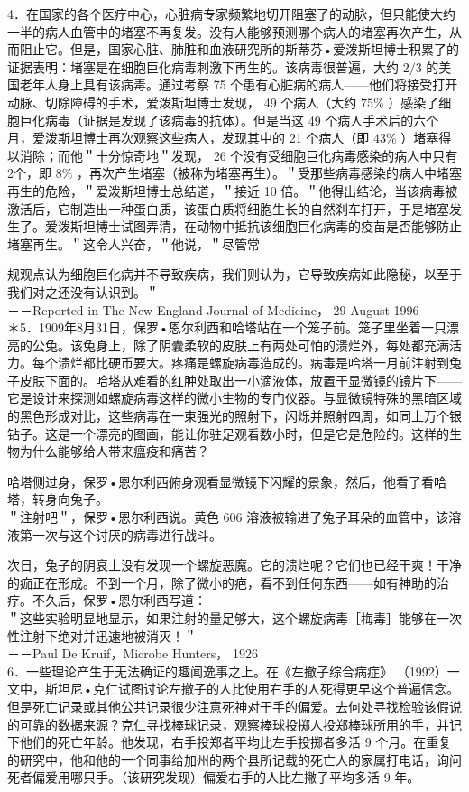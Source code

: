 4．在国家的各个医疗中心，心脏病专家频繁地切开阻塞了的动脉，但只能使大约一半的病人血管中的堵塞不再复发。没有人能够预测哪个病人的堵塞再次产生，从而阻止它。但是，国家心脏、肺脏和血液研究所的斯蒂芬•爱泼斯坦博士积累了的证据表明：堵塞是在细胞巨化病毒刺激下再生的。该病毒很普遍，大约 $2 / 3$ 的美国老年人身上具有该病毒。通过考察 75 个患有心脏病的病人——他们将接受打开动脉、切除障碍的手术，爱泼斯坦博士发现， 49 个病人（大约 $75 \%$ ）感染了细胞巨化病毒（证据是发现了该病毒的抗体）。但是当这 49 个病人手术后的六个月，爱泼斯坦博士再次观察这些病人，发现其中的 21 个病人（即 $43 \%$ ）堵塞得以消除；而他＂十分惊奇地＂发现， 26 个没有受细胞巨化病毒感染的病人中只有 2个，即 $8 \%$ ，再次产生堵塞（被称为堵塞再生）。＂受那些病毒感染的病人中堵塞再生的危险，＂爱泼斯坦博士总结道，＂接近 10 倍。＂他得出结论，当该病毒被激活后，它制造出一种蛋白质，该蛋白质将细胞生长的自然刹车打开，于是堵塞发生了。爱泼斯坦博士试图弄清，在动物中抵抗该细胞巨化病毒的疫苗是否能够防止堵塞再生。＂这令人兴奋，＂他说，＂尽管常

规观点认为细胞巨化病并不导致疾病，我们则认为，它导致疾病如此隐秘，以至于我们对之还没有认识到。＂\\
－－Reported in The New England Journal of Medicine， 29 August 1996\\
＊5．1909年8月31日，保罗•恩尔利西和哈塔站在一个笼子前。笼子里坐着一只漂亮的公兔。该兔身上，除了阴囊柔软的皮肤上有两处可怕的溃烂外，每处都充满活力。每个溃烂都比硬币要大。疼痛是螺旋病毒造成的。病毒是哈塔一月前注射到兔子皮肤下面的。哈塔从难看的红肿处取出一小滴液体，放置于显微镜的镜片下——它是设计来探测如螺旋病毒这样的微小生物的专门仪器。与显微镜特殊的黑暗区域的黑色形成对比，这些病毒在一束强光的照射下，闪烁并照射四周，如同上万个银钻子。这是一个漂亮的图画，能让你驻足观看数小时，但是它是危险的。这样的生物为什么能够给人带来瘟疫和痛苦？

哈塔侧过身，保罗•恩尔利西俯身观看显微镜下闪耀的景象，然后，他看了看哈塔，转身向兔子。\\
＂注射吧＂，保罗•恩尔利西说。黄色 606 溶液被输进了兔子耳朵的血管中，该溶液第一次与这个讨厌的病毒进行战斗。

次日，兔子的阴衰上没有发现一个螺旋恶魔。它的溃烂呢？它们也已经干爽！干净的痂正在形成。不到一个月，除了微小的疤，看不到任何东西——如有神助的治疗。不久后，保罗•恩尔利西写道：\\
＂这些实验明显地显示，如果注射的量足够大，这个螺旋病毒［梅毒］能够在一次性注射下绝对并迅速地被消灭！＂\\
－－Paul De Kruif，Microbe Hunters， 1926\\
6．一些理论产生于无法确证的趣闻逸事之上。在《左撤子综合病症》 （1992）一文中，斯坦尼•克仁试图讨论左撤子的人比使用右手的人死得更早这个普遍信念。但是死亡记录或其他公共记录很少注意死神对于手的偏爱。去何处寻找检验该假说的可靠的数据来源？克仁寻找棒球记录，观察棒球投掷人投郑棒球所用的手，并记下他们的死亡年龄。他发现，右手投郑者平均比左手投掷者多活 9 个月。在重复的研究中，他和他的一个同事给加州的两个县所记载的死亡人的家属打电话，询问死者偏爱用哪只手。（该研究发现）偏爱右手的人比左撇子平均多活 9 年。


